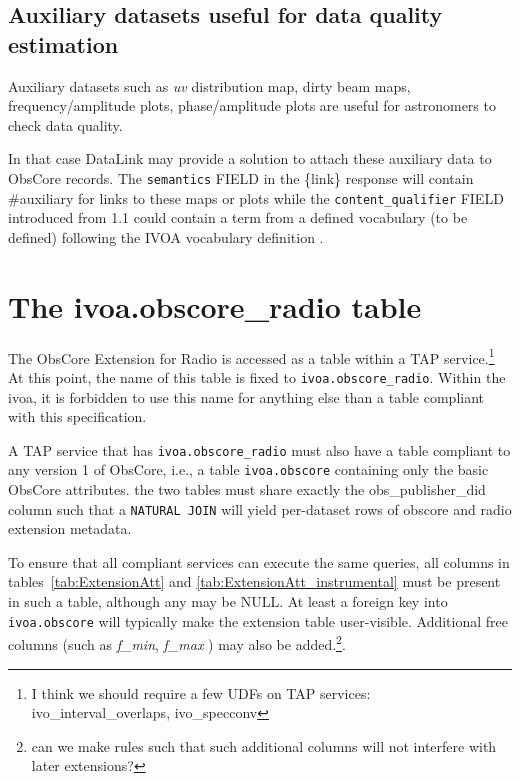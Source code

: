 \documentclass[11pt,a4paper]{ivoa}
\begin{document}
\subsection{Auxiliary datasets useful for data quality estimation}

Auxiliary datasets such as  \emph{uv} distribution map, dirty beam maps, frequency/amplitude plots, phase/amplitude plots are useful for astronomers to check data quality.

In that case DataLink \citep{2023ivoa.spec.1215B} may provide a solution to attach these auxiliary data to ObsCore records. The \texttt{semantics} FIELD in the \{link\}
response  will contain \#auxiliary  for links to these maps or plots while  the \texttt{content\_qualifier} FIELD introduced from 1.1  could contain a term from a defined vocabulary (to be defined) following the IVOA vocabulary definition  \citep{2021ivoa.spec.0525D}.

\section{The ivoa.obscore\_radio table}
\label{sec:implementation}
The ObsCore Extension for Radio is accessed as a table within a TAP
\citep{2019ivoa.spec.0927D} service.\footnote{I think we should require a
few UDFs on TAP services: ivo\_interval\_overlaps, ivo\_specconv}  At this
point, the name of this table is fixed to \verb|ivoa.obscore_radio|.
Within the ivoa, it is forbidden to use this name for anything else than a table compliant
with this specification.


A TAP service that has \verb|ivoa.obscore_radio| must also have a table
compliant to any version 1 of ObsCore, i.e., a table
\verb|ivoa.obscore| containing only the basic ObsCore attributes.
the two tables must share exactly the obs\_publisher\_did 
column such
that a \verb|NATURAL JOIN| will yield per-dataset rows of obscore and
radio extension metadata.  

To ensure that all compliant services can execute the same queries,
all columns in tables~\ref{tab:ExtensionAtt} and \ref{tab:ExtensionAtt_instrumental} must be present in such a
table, although any may be NULL. At least a foreign key into \verb|ivoa.obscore| will typically
make the extension table user-visible. Additional free columns (such as \emph{f\_min}, \emph{f\_max} ) may also
be added.\footnote{can we make rules such that such additional columns
will not interfere with later extensions?}.
\end{document}
